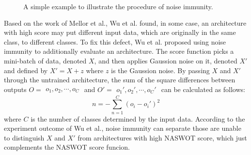 \documentclass[sigconf]{acmart}
\begin{document}
    \begin{figure*}[htb]
        \vspace{-\baselineskip}
        \caption{A simple example to illustrate the procedure of noise immunity.}
        \label{fig:ni}
        \centering
        \vspace{-\baselineskip}
    \end{figure*}
    Based on the work of Mellor et al., Wu et al. \cite{10.1145/3491396.3506510} 
    found, in some case, an architecture with high score may put different 
    input data, which are originally in the same class, to different classes. 
    To fix this defect, Wu et al. proposed using noise immunity to additionally 
    evaluate an architecture. The score function picks a mini-batch of data, 
    denoted $X$, and then applies Gaussion noise on it, denoted $X'$ and defined 
    by $X'=X+z$ where $z$ is the Gaussion noise. By passing $X$ and $X'$ through 
    the untrained architecture, the sum of the square differences between outputs 
    $O=\begin{matrix}o_1,o_2,\cdots,o_C\end{matrix}$ and 
    $O'=\begin{matrix}o_1',o_2',\cdots,o_C'\end{matrix}$ can be calculated as 
    follows:
    \begin{equation}
        n=-\sum^C_{n=1}(o_i-o_i')^2
    \end{equation}
    where $C$ is the number of classes determined by the input data.
    According to the experiment outcome of Wu et al., noise immunity can separate 
    those are unable to distinguish $X$ and $X'$ from architectures with high NASWOT 
    score, which just complements the NASWOT score funcion.
    
\end{document}
